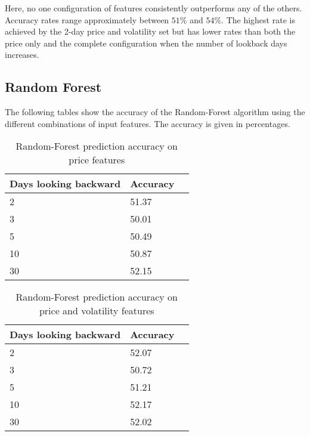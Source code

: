 \documentclass{article}
\begin{document}
Here, no one configuration of features consistently outperforms any of the others. Accuracy rates range approximately between $51\%$ and $54\%$. The highest rate is achieved by the 2-day price and volatility set but has lower rates than both the price only and the complete configuration when the number of lookback days  increases.

\newpage
\subsection{Random Forest}
The following tables show the accuracy of the Random-Forest algorithm using the different combinations of input features. The accuracy is given in percentages.
\\
\begin{table}[!h]
\begin{center}
    \begin{tabular}{ | l | l | p{3cm} |}
    \hline
    Days looking backward & Accuracy \\ \hline
    2 & 51.37  \\ \hline
    3 & 50.01  \\ \hline
    5 & 50.49  \\ \hline
    10 & 50.87  \\ \hline
    30 & 52.15 \\ 
    \hline
    \end{tabular}
\caption{Random-Forest prediction accuracy on price features}
\end{center}
\end{table}

\begin{table}[h]
\begin{center}
    \begin{tabular}{ | l | l | p{3cm} |}
    \hline
    Days looking backward & Accuracy \\ \hline
    2 & 52.07  \\ \hline
    3 & 50.72  \\ \hline
    5 & 51.21  \\ \hline
    10 & 52.17  \\ \hline
    30 & 52.02 \\ 
    \hline
    \end{tabular}
\caption{Random-Forest prediction accuracy on price and volatility features}
\end{center}
\end{table}
\end{document}
